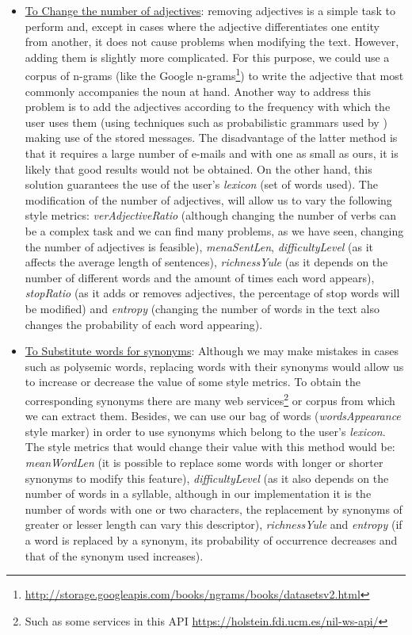 \begin{itemize}
	\item \underline{To Change the number of adjectives}: removing adjectives is a simple task to perform and, except in cases where the adjective differentiates one entity from another, it does not cause problems when modifying the text. However, adding them is slightly more complicated. For this purpose, we could use a corpus of n-grams (like the Google n-grams\footnote{\url{http://storage.googleapis.com/books/ngrams/books/datasetsv2.html}}) to write the adjective that most commonly accompanies the noun at hand. Another way to address this problem is to add the adjectives according to the frequency with which the user uses them (using techniques such as probabilistic grammars used by \cite{halliday2014corpus}) making use of the stored messages. The disadvantage of the latter method is that it requires a large number of e-mails and with one as small as ours, it is likely that good results would not be obtained. On the other hand, this solution guarantees the use of the user's \textit{lexicon} (set of words used). The modification of the number of adjectives, will allow us to vary the following style metrics: \textit{verAdjectiveRatio} (although changing the number of verbs can be a complex task and we can find many problems, as we have seen, changing the number of adjectives is feasible), \textit{menaSentLen}, \textit{difficultyLevel} (as it affects the average length of sentences), \textit{richnessYule} (as it depends on the number of different words and the amount of times each word appears), \textit{stopRatio} (as it adds or removes adjectives, the percentage of stop words will be modified) and \textit{entropy} (changing the number of words in the text also changes the probability of each word appearing).
	
	\item\underline{To Substitute words for synonyms}: Although we may make mistakes in cases such as polysemic words, replacing words with their synonyms would allow us to increase or decrease the value of some style metrics. To obtain the corresponding synonyms there are many web services\footnote{Such as some services in this API \url{https://holstein.fdi.ucm.es/nil-ws-api/}} or corpus from which we can extract them. Besides, we can use our bag of words (\textit{wordsAppearance} style marker) in order to use synonyms which belong to the user's \textit{lexicon}. The style metrics that would change their value with this method would be: \textit{meanWordLen} (it is possible to replace some words with longer or shorter synonyms to modify this feature), \textit{difficultyLevel} (as it also depends on the number of words in a syllable, although in our implementation it is the number of words with one or two characters, the replacement by synonyms of greater or lesser length can vary this descriptor), \textit{richnessYule} and \textit{entropy} (if a word is replaced by a synonym, its probability of occurrence decreases and that of the synonym used increases).
	

\end{itemize}
